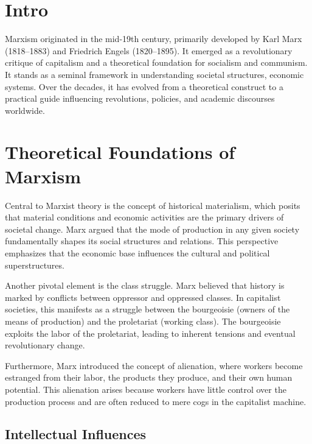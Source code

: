 \documentclass[14pt, russian]{matmex-diploma-custom}
\begin{document}

\maketitle

\section{Intro}
Marxism originated in the mid-19th century, primarily developed by Karl Marx (1818–1883) and Friedrich Engels (1820–1895).
It emerged as a revolutionary critique of capitalism and a theoretical foundation for socialism and communism.
It stands as a seminal framework in understanding societal structures, economic systems.
Over the decades, it has evolved from a theoretical construct to a practical guide influencing revolutions, policies, and academic discourses worldwide.

\section{Theoretical Foundations of Marxism}
Central to Marxist theory is the concept of historical materialism, which posits that material conditions and economic activities are the primary drivers of societal change. Marx argued that the mode of production in any given society fundamentally shapes its social structures and relations. This perspective emphasizes that the economic base influences the cultural and political superstructures.

Another pivotal element is the class struggle. Marx believed that history is marked by conflicts between oppressor and oppressed classes. In capitalist societies, this manifests as a struggle between the bourgeoisie (owners of the means of production) and the proletariat (working class). The bourgeoisie exploits the labor of the proletariat, leading to inherent tensions and eventual revolutionary change.

Furthermore, Marx introduced the concept of alienation, where workers become estranged from their labor, the products they produce, and their own human potential. This alienation arises because workers have little control over the production process and are often reduced to mere cogs in the capitalist machine.

\subsection{Intellectual Influences}
\end{document}
